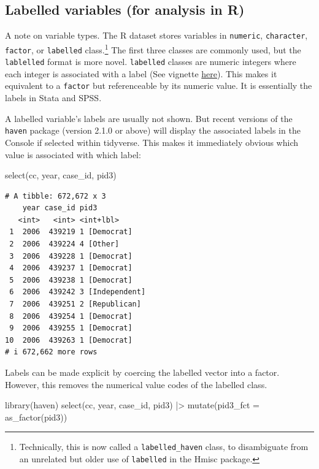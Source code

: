 \documentclass[10pt,article,oneside]{memoir}
\theoremstyle{definition}
\newenvironment{Shaded}{\begin{snugshade}}{\end{snugshade}}
\newcommand{\AttributeTok}[1]{\textcolor[rgb]{0.40,0.45,0.13}{#1}}
\newcommand{\FunctionTok}[1]{\textcolor[rgb]{0.28,0.35,0.67}{#1}}
\newcommand{\NormalTok}[1]{\textcolor[rgb]{0.00,0.23,0.31}{#1}}
\newcommand{\SpecialCharTok}[1]{\textcolor[rgb]{0.37,0.37,0.37}{#1}}
\begin{document}
\subsection{Labelled variables (for analysis in
R)}\label{labelled-variables-for-analysis-in-r}

A note on variable types. The R dataset stores variables in
\texttt{numeric}, \texttt{character}, \texttt{factor}, or
\texttt{labelled} class.\footnote{Technically, this is now called a
  \texttt{labelled\_haven} class, to disambiguate from an unrelated but
  older use of \texttt{labelled} in the Hmisc package.} The first three
classes are commonly used, but the \texttt{lablelled} format is more
novel. \texttt{labelled} classes are numeric integers where each integer
is associated with a label (See vignette
\href{https://cran.r-project.org/web/packages/labelled/vignettes/intro_labelled.html}{here}).
This makes it equivalent to a \texttt{factor} but referenceable by its
numeric value. It is essentially the labels in Stata and SPSS.

A labelled variable's labels are usually not shown. But recent versions
of the \texttt{haven} package (version 2.1.0 or above) will display the
associated labels in the Console if selected within tidyverse. This
makes it immediately obvious which value is associated with which label:

\begin{Shaded}
\begin{Highlighting}[]
\FunctionTok{select}\NormalTok{(cc, year, case\_id, pid3)}
\end{Highlighting}
\end{Shaded}

\begin{verbatim}
# A tibble: 672,672 x 3
    year case_id pid3           
   <int>   <int> <int+lbl>      
 1  2006  439219 1 [Democrat]   
 2  2006  439224 4 [Other]      
 3  2006  439228 1 [Democrat]   
 4  2006  439237 1 [Democrat]   
 5  2006  439238 1 [Democrat]   
 6  2006  439242 3 [Independent]
 7  2006  439251 2 [Republican] 
 8  2006  439254 1 [Democrat]   
 9  2006  439255 1 [Democrat]   
10  2006  439263 1 [Democrat]   
# i 672,662 more rows
\end{verbatim}

\noindent Labels can be made explicit by coercing the labelled vector
into a factor. However, this removes the numerical value codes of the
labelled class.

\begin{Shaded}
\begin{Highlighting}[]
\FunctionTok{library}\NormalTok{(haven)}
\FunctionTok{select}\NormalTok{(cc, year, case\_id, pid3) }\SpecialCharTok{|\textgreater{}} 
  \FunctionTok{mutate}\NormalTok{(}\AttributeTok{pid3\_fct =} \FunctionTok{as\_factor}\NormalTok{(pid3))}
\end{Highlighting}
\end{Shaded}
\end{document}
